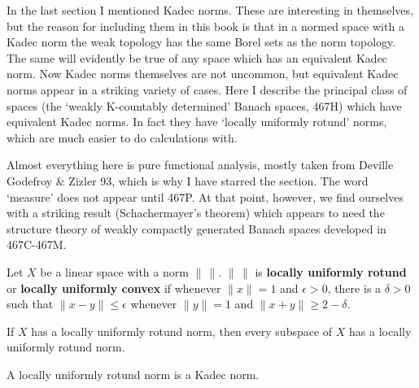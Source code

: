 
\def\chaptername{Pointwise compact sets of measurable functions}
\def\sectionname{Locally uniformly rotund norms}

\def\normY#1{\|#1\|_{\lower1pt\hbox{\fivei Y}}}



In the last section I mentioned Kadec norms.   These are interesting in
themselves, but the reason for including them in this book is that in a
normed space with a Kadec norm the weak topology has the same Borel sets
as the norm topology.
The same will evidently be true of any space which has an equivalent
Kadec norm.   Now Kadec norms
themselves are not uncommon, but equivalent Kadec norms appear in a
striking variety of cases.   Here I describe the principal class of spaces
(the `weakly K-countably determined' Banach spaces, 467H) which have
equivalent
Kadec norms.   In fact they have `locally uniformly rotund' norms, which
are much easier to do calculations with.

Almost everything here is pure functional analysis, mostly taken from
{\smc Deville Godefroy \& Zizler 93}, which is why I have starred the
section.   The word `measure' does not appear until 467P.   At that
point, however, we find ourselves with a striking result
(Schachermayer's theorem) which appears to need the structure theory of
weakly compactly generated Banach spaces developed in
467C-467M. %

 Let $X$ be a linear space with a norm
$\|\,\|$.   $\|\,\|$ is {\bf locally uniformly rotund} or {\bf locally
uniformly convex} if whenever $\|x\|=1$ and $\epsilon>0$, there is a
$\delta>0$ such that
$\|x-y\|\le\epsilon$ whenever $\|y\|=1$ and $\|x+y\|\ge 2-\delta$.

If $X$ has a locally uniformly rotund norm, then every subspace of $X$
has a locally uniformly rotund norm.   

 A locally uniformly rotund norm is a Kadec
norm.


